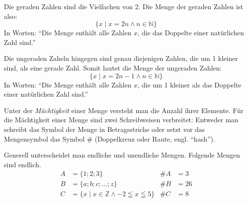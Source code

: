 \begin{bsp}
 Die geraden Zahlen sind die Vielfachen von 2. Die Menge der geraden Zahlen ist also:
 \begin{equation*}
  \lbrace x \mid x=2n \wedge n\in\mathbb{N}\rbrace
 \end{equation*}
 In Worten: "`Die Menge enthält alle Zahlen \(x\), die das Doppelte einer natürlichen Zahl sind."'
 
 Die ungeraden Zaheln hingegen sind genau diejenigen Zahlen, die um 1 kleiner sind, als eine gerade Zahl. Somit lautet die Menge der ungeraden Zahlen:
 \begin{equation*}
  \lbrace x \mid x=2n-1 \wedge n\in\mathbb{N}\rbrace
 \end{equation*}
 In Worten: "`Die Menge enthält alle Zahlen \(x\), die um 1 kleiner als das Doppelte einer natürlichen Zahl sind."'
\end{bsp}

\begin{defi}[Mächtigkeit]
 Unter der \emph{Mächtigkeit} einer Menge versteht man die Anzahl ihrer Elemente. Für die Mächtigkeit einer Menge sind zwei Schreibweisen verbreitet: Entweder man schreibt das Symbol der Menge in Betragsstriche oder setzt vor das Mengensymbol das Symbol \(\#\) (Doppelkreuz oder Raute, engl. "`hash"').
\end{defi}

\begin{bsp}[Mächtigkeit]
Generell unterscheidet man endliche und unendliche Mengen. Folgende Mengen sind endlich.
 \begin{align*}
  A&=\lbrace 1;2;3 \rbrace & \#A &=3\\
  B&=\lbrace a;b;c;\ldots;z\rbrace & \#B &= 26\\
  C&=\lbrace x \mid x\in\mathbb{Z} \wedge -2\leqq x \leqq 5\rbrace & \#C &= 8
 \end{align*}
\end{bsp}

